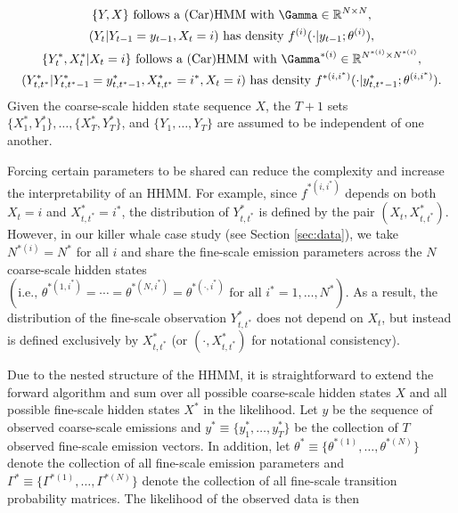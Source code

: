 \begin{gather*}
    \{Y, X\} \text{ follows a (Car)HMM with } \Gamma \in \bbR^{N \times N}, \\
    (Y_t | Y_{t-1} = y_{t-1}, X_t = i) \text{ has density } f^{(i)}(\cdot|y_{t-1};\theta^{(i)}), \\
    \{Y^*_t,X^*_t | X_t = i\} \text{ follows a (Car)HMM with } \Gamma^{*(i)} \in \bbR^{N^{*(i)} \times N^{*(i)}}, \\
    (Y^*_{t,t^*} | Y^*_{t,t^*-1} = y^*_{t,t^*-1}, X^*_{t,t^*} = i^*, X_t = i) \text{ has density } f^{*(i,i^*)}(\cdot|y^{*}_{t,t^*-1};\theta^{(i,i^*)}).
\end{gather*}
Given the coarse-scale hidden state sequence $X$, the $T+1$ sets $\{X_1^*, Y_1^*\}, \ldots, \{X^*_T, Y^*_T\}$, and $\{Y_1,\ldots,Y_T\}$ are assumed to be independent of one another.

Forcing certain parameters to be shared can reduce the complexity and increase the interpretability of an HHMM. For example, since $f^{*(i,i^*)}$ depends on both $X_t = i$ and $X^*_{t,t^*} = i^*$, the distribution of $Y^*_{t,t^*}$ is defined by the pair $(X_t,X^*_{t,t^*})$. However, in our killer whale case study (see Section \ref{sec:data}), we take $N^{*(i)} = N^*$ for all $i$ and share the fine-scale emission parameters across the $N$ coarse-scale hidden states $\left( \text{i.e., } \theta^{*(1,i^*)} = \cdots = \theta^{*(N,i^*)} = \theta^{*(\cdot,i^*)} \text{ for all } i^* = 1, \ldots, N^* \right)$. As a result, the distribution of the fine-scale observation $Y^*_{t,t^*}$ does not depend on $X_t$, but instead is defined exclusively by $X^*_{t,t^*}$ (or $(\cdot,X^*_{t,t^*})$ for notational consistency). %


Due to the nested structure of the HHMM, %
it is straightforward to extend the forward algorithm and sum over all possible coarse-scale hidden states $X$ and all possible fine-scale hidden states $X^*$ in the likelihood.
%
Let $y$ be the sequence of observed coarse-scale emissions and
$y^* \equiv \{y^*_1, \ldots,y^*_T\}$ be the collection of $T$ observed fine-scale emission vectors.
%
In addition, let $\theta^* \equiv \{\theta^{*(1)}, \ldots, \theta^{*(N)}\}$ denote the collection of all fine-scale emission parameters and $\Gamma^* \equiv \{\Gamma^{*(1)}, \ldots, \Gamma^{*(N)}\}$ denote the collection of all fine-scale transition probability matrices. The likelihood of the observed data is then

